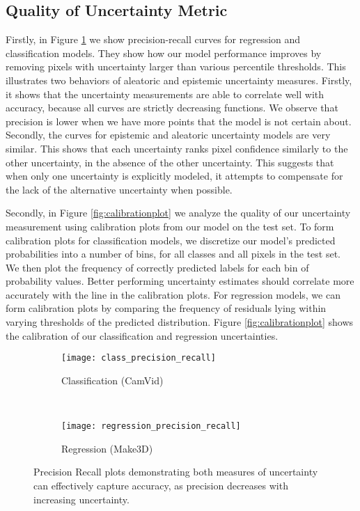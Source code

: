 \documentclass{article}
\begin{document}
\subsection{Quality of Uncertainty Metric}



Firstly, in Figure \ref{fig:prec_recall} we show precision-recall curves for regression and classification models. They show how our model performance improves by removing pixels with uncertainty larger than various percentile thresholds. This illustrates two behaviors of aleatoric and epistemic uncertainty measures. Firstly, it shows that the uncertainty measurements are able to correlate well with accuracy, because all curves are strictly decreasing functions. We observe that precision is lower when we have more points that the model is not certain about. Secondly, the curves for epistemic and aleatoric uncertainty models are very similar. This shows that each uncertainty ranks pixel confidence similarly to the other uncertainty, in the absence of the other uncertainty. This suggests that when only one uncertainty is explicitly modeled, it attempts to compensate for the lack of the alternative uncertainty when possible.

Secondly, in Figure \ref{fig:calibrationplot} we analyze the quality of our uncertainty measurement using calibration plots from our model on the test set. To form calibration plots for classification models, we discretize our model’s predicted probabilities into a number of bins, for all classes and all pixels in the test set. We then plot the frequency of correctly predicted labels for each bin of probability values. Better performing uncertainty estimates should correlate more accurately with the line  in the calibration plots. For regression models, we can form calibration plots by comparing the frequency of residuals lying within varying thresholds of the predicted distribution. Figure \ref{fig:calibrationplot} shows the calibration of our classification and regression uncertainties.


\begin{figure}[t]
    \centering
    \begin{subfigure}[t]{0.4\linewidth}
        \centering
        \texttt{[image: class\_precision\_recall]}
        \caption{Classification (CamVid)}
    \end{subfigure}
    ~ 
    \begin{subfigure}[t]{0.4\linewidth}
        \centering
        \texttt{[image: regression\_precision\_recall]}
        \caption{Regression (Make3D)}
    \end{subfigure}
    \caption{
    Precision Recall plots demonstrating both measures of uncertainty can effectively capture accuracy, as precision decreases with increasing uncertainty.}
\label{fig:prec_recall}
\vspace{-3mm}
\end{figure}
\end{document}
